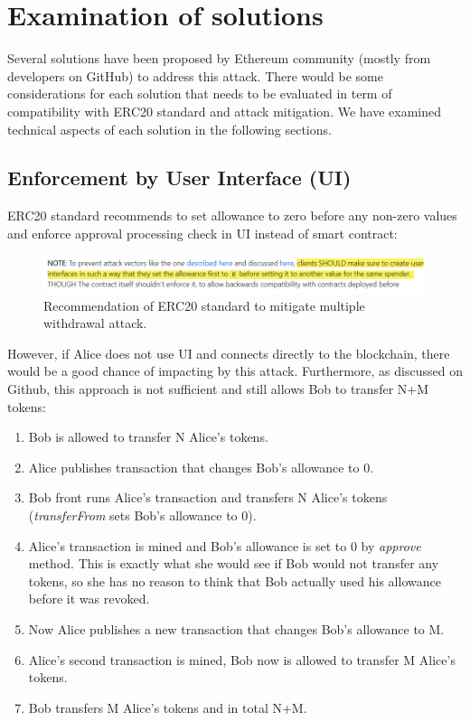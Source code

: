 \newpage
\section{Examination of solutions}
Several solutions have been proposed by Ethereum community (mostly from developers on GitHub) to address this attack. There would be some considerations for each solution that needs to be evaluated in term of compatibility with ERC20 standard and attack mitigation. We have examined technical aspects of each solution in the following sections.

\subsection{Enforcement by User Interface (UI)}
ERC20 standard recommends to set allowance to zero before any non-zero values and enforce approval processing check in UI instead of smart contract:
\begin{figure}[H]
	\centering
	\includegraphics[width=1.0\linewidth]{figures/multiple_withdrawal_03.png}
	\caption{Recommendation of ERC20 standard to mitigate multiple withdrawal attack.}
\end{figure}
\noindent However, if Alice does not use UI and connects directly to the blockchain, there would be a good chance of impacting by this attack. Furthermore, as discussed on Github\cite{Ref14}, this approach is not sufficient and still allows Bob to transfer N+M tokens:
\begin{enumerate}
	\item Bob is allowed to transfer N Alice’s tokens.
	\item Alice publishes transaction that changes Bob’s allowance to 0.
	\item Bob front runs Alice’s transaction and transfers N Alice’s tokens (\textit{transferFrom} sets Bob’s allowance to 0).
	\item Alice’s transaction is mined and Bob’s allowance is set to 0 by \textit{approve} method. This is exactly what she would see if Bob would not transfer any tokens, so she has no reason to think that Bob actually used his allowance before it was revoked.
	\item Now Alice publishes a new transaction that changes Bob’s allowance to M.
	\item Alice’s second transaction is mined, Bob now is allowed to transfer M Alice’s tokens.
	\item Bob transfers M Alice’s tokens and in total N+M.\newline
\end{enumerate}
